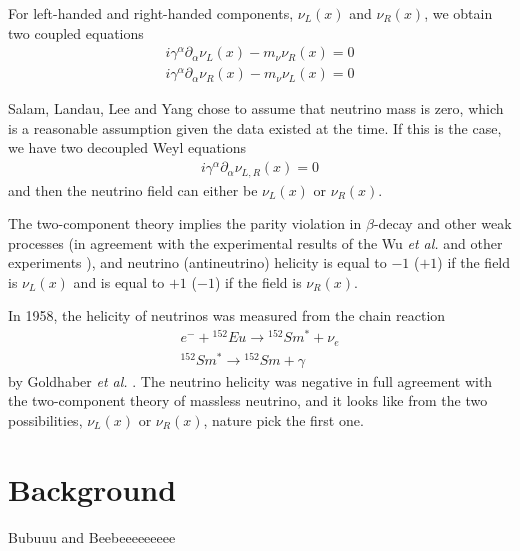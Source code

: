 \documentclass[english]{article}
\begin{document}
    For left-handed and right-handed components, $\nu_{L} (x)$ and  $\nu_{R} (x)$, we obtain two coupled equations
    \begin{gather}
    	i\gamma^{\alpha} \partial_{\alpha} \nu_{L} (x) - m_{\nu} \nu_{R} (x) = 0 \\
        i\gamma^{\alpha} \partial_{\alpha} \nu_{R} (x) - m_{\nu} \nu_{L} (x) = 0
    \end{gather}
    
    Salam, Landau, Lee and Yang chose to assume that neutrino mass is zero, which is a reasonable assumption given the data existed at the time. If this is the case, we have two decoupled Weyl equations
    \begin{gather}
    	i\gamma^{\alpha} \partial_{\alpha} \nu_{L,R} (x) = 0
    \end{gather}
    and then the neutrino field can either be $\nu_{L} (x)$ or $\nu_{R} (x)$.
    
    The two-component theory implies the parity violation in $\beta$-decay and other weak processes (in agreement with the experimental results of the Wu \textit{et al.} and other experiments \cite{wu1957} \cite{garwinledermanweinrich1957}), and neutrino (antineutrino) helicity is equal to $-1$ ($+1$) if the field is $\nu_{L} (x)$ and is equal to $+1$ ($-1$) if the field is $\nu_{R} (x)$.
    
    In 1958, the helicity of neutrinos was measured from the chain reaction
    \begin{gather}
    	e^{-} + {}^{152} Eu \rightarrow {}^{152} Sm^{*} + \nu_{e} \\
        {}^{152} Sm^{*} \rightarrow {}^{152} Sm + \gamma
    \end{gather}
    by Goldhaber \textit{et al.} \cite{goldhabergrodzinssunyar1958}. The neutrino helicity was negative in full agreement with the two-component theory of massless neutrino, and it looks like from the two possibilities, $\nu_{L} (x)$ or $\nu_{R} (x)$, nature pick the first one.

\section{Background}

	Bubuuu and Beebeeeeeeeee
\end{document}
